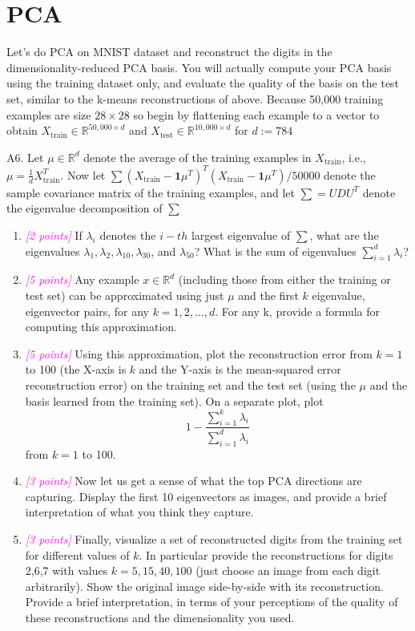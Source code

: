 \documentclass{article}
\newcommand{\field}[1]{\mathbb{#1}}
\newcommand{\1}{\mathbf{1}}
\newcommand{\R}{\field{R}} %
\newcommand{\points}[1]{\small\textcolor{magenta}{\emph{[#1 points]}} \normalsize}
\begin{document}
\newpage
\section*{PCA}

Let’s do PCA on MNIST dataset and reconstruct the digits in the dimensionality-reduced PCA basis. You will actually compute your PCA basis using the training dataset only, and evaluate the quality of the basis on the  test set, similar to the k-means reconstructions of above. Because 50,000 training examples are size $28\times 28$ so begin by flattening each example to a vector to obtain $X_{\text{train}} \in \R^{50,000 \times d}$ and $X_{\text{test}} \in \R^{10,000\times d}$ for $d:=784$

A6. Let $\mu\in\R^d$ denote the average of the training examples in $X_{\text{train}}$, i.e., $\mu = \frac{1}{d} X^T_{\text{train}}$. Now let $\sum (X_{\text{train}} - \1 \mu^T)^T (X_{\text{train}} - \1\mu^T)/50000$ denote the sample covariance matrix of the training examples, and let $\sum =UDU^T$ denote the eigenvalue decomposition of $\sum$
\begin{enumerate}
    \item \points{2} If $\lambda_i$ denotes the $i-th$ largest eigenvalue of $\sum$, what are the eigenvalues $\lambda_1, \lambda_2, \lambda_{10}, \lambda_{30}$, and $\lambda_{50}$? What is the sum of eigenvalues $\sum^d_{i=1}\lambda_i$?
    
    \item \points{5} Any example $x\in\R^d$ (including those from either the training or test set) can be approximated using just $\mu$ and the first $k$ eigenvalue, eigenvector pairs, for any $k=1,2,\hdots,d$.  For any k, provide a formula for computing this approximation.
    
    \item \points{5} Using this approximation, plot the reconstruction error from $k=1$ to 100 (the X-axis is $k$ and the Y-axis is the mean-squared error reconstruction error) on the training set and the test set (using the $\mu$ and the basis learned from the training set). On a separate plot, plot 
    $$1 - \frac{\sum^k_{i=1}\lambda_i}{\sum^d_{i=1}\lambda_i}$$
    from $k=1$ to 100.
    
    \item \points{3} Now let us get a sense of what the top PCA directions are capturing. Display the first  10 eigenvectors as images, and provide a brief interpretation of what you think they capture.
    
    \item \points{3} Finally, visualize a set of reconstructed digits from the training set for different values of $k$. In particular provide the reconstructions for digits 2,6,7 with values $k=5,15,40,100$ (just choose an image from each digit arbitrarily). Show the original image side-by-side with its reconstruction.  Provide a brief interpretation, in terms of your perceptions of the quality of these reconstructions and the dimensionality you used.
\end{enumerate}
\end{document}
